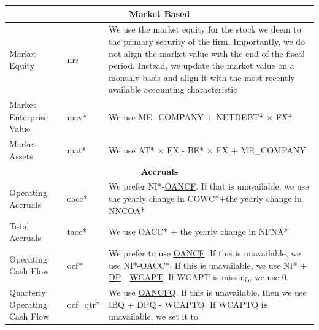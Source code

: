 \documentclass[12pt,title,fleqn]{article}
\begin{document}
{\begin{longtable}{@{\extracolsep{\fill}}|m{5cm}|l|m{8cm}|@{}}
	\hline 
	\multicolumn{3}{|c|}{\textbf{Market Based}} \\
	\hline     

    Market Equity & me & We use the market equity for the stock we deem to the primary security of the firm. Importantly, we do not align the market value with the end of the fiscal period. Instead, we update the market value on a monthly basis and align it with the most recently available accounting characteristic \\
    
    Market Enterprise Value & mev\mbox{*} & We use ME\_COMPANY + NETDEBT\mbox{*} $\times$ FX\mbox{*} \\
    
    Market Assets & mat\mbox{*} & We use AT\mbox{*} $\times$ FX - BE\mbox{*} $\times$ FX + ME\_COMPANY \\

	\hline 
	\multicolumn{3}{|c|}{\textbf{Accruals}} \\
	\hline 
	
	Operating Accruals & oacc\mbox{*} & We prefer NI\mbox{*}-\href{https://wrds-www.wharton.upenn.edu/data-dictionary/form_metadata/comp_na_daily_all_funda_cashflowitems/OANCF/}{OANCF}. If that is unavailable, we use the yearly change in COWC\mbox{*}+the yearly change in NNCOA\mbox{*}\\
	
	Total Accruals & tacc\mbox{*} & We use OACC\mbox{*} + the yearly change in NFNA\mbox{*} \\
	
	Operating Cash Flow & ocf\mbox{*} & We prefer to use \href{https://wrds-www.wharton.upenn.edu/data-dictionary/form_metadata/comp_na_daily_all_funda_cashflowitems/OANCF/}{OANCF}. If this is unavailable, we use NI\mbox{*}-OACC\mbox{*}. If this is unavailable, we use NI\mbox{*} + \href{https://wrds-www.wharton.upenn.edu/data-dictionary/form_metadata/comp_na_daily_all_funda_incomestatementitems/DP/}{DP} - \href{https://wrds-www.wharton.upenn.edu/data-dictionary/form_metadata/comp_global_daily_gfunda_dataitemsmz/WCAPT/}{WCAPT}. If WCAPT is missing, we use 0.\\
	
	Quarterly Operating Cash Flow & ocf\_qtr\mbox{*} & We use \href{https://wrds-www.wharton.upenn.edu/data-dictionary/form_metadata/comp_na_daily_all_funda_cashflowitems/OANCF/}{OANCFQ}. If this is unavailable, then we use \href{https://wrds-www.wharton.upenn.edu/data-dictionary/form_metadata/comp_na_daily_all_funda_incomestatementitems/IB/}{IBQ} + \href{https://wrds-www.wharton.upenn.edu/data-dictionary/form_metadata/comp_na_daily_all_funda_incomestatementitems/DP/}{DPQ} - \href{https://wrds-www.wharton.upenn.edu/data-dictionary/form_metadata/comp_na_daily_all_funda_cashflowitems/WCAPCH/}{WCAPTQ}. If WCAPTQ is unavailable, we set it to \\
	

\end{longtable}}
\end{document}
